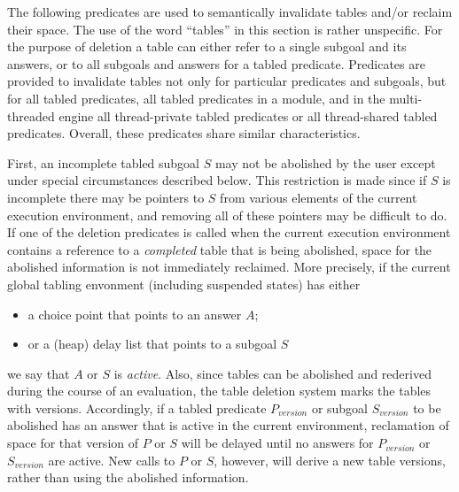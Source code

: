 \begin{description}
The following predicates are used to semantically invalidate tables
and/or reclaim their space. The use of the word ``tables'' in this
section is rather unspecific.  For the purpose of deletion a table can
either refer to a single subgoal and its answers, or to all subgoals
and answers for a tabled predicate.  Predicates are provided to
invalidate tables not only for particular predicates and subgoals, but
for all tabled predicates, all tabled predicates in a module, and in
the multi-threaded engine all thread-private tabled predicates or all
thread-shared tabled predicates.  Overall, these predicates share
similar characteristics.

First, an incomplete tabled subgoal $S$ may not be abolished by the
user except under special circumstances described below.  This
restriction is made since if $S$ is incomplete there may be pointers
to $S$ from various elements of the current execution environment, and
removing all of these pointers may be difficult to do.  If one of the
deletion predicates is called when the current execution environment
contains a reference to a {\em completed} table that is being
abolished, space for the abolished information is not immediately
reclaimed.  More precisely, if the current global tabling envonment
(including suspended states) has either
\begin{itemize}
\item a choice point that points to an answer $A$; 
\item or a (heap) delay list that points to a subgoal $S$
\end{itemize}
we say that $A$ or $S$ is {\em active}.  Also, since tables can be
abolished and rederived during the course of an evaluation, the table
deletion system marks the tables with versions.  Accordingly, if a
tabled predicate $P_{version}$ or subgoal $S_{version}$ to be
abolished has an answer that is active in the current environment,
reclamation of space for that version of $P$ or $S$ will be delayed
until no answers for $P_{version}$ or $S_{version}$ are active.  New
calls to $P$ or $S$, however, will derive a new table versions, rather
than using the abolished information.


\end{description}
